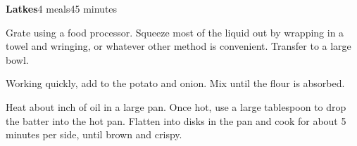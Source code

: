 \documentclass[../Cookbook.tex]{subfiles}
\begin{document}
\begin{recipe}[Latke]{\textbf{Latkes}}{4 meals}{45 minutes}

Grate using a food processor. Squeeze most of the liquid out by wrapping in a towel and wringing, or whatever other method is convenient.
Transfer to a large bowl.

Working quickly, add to the potato and onion. Mix until the flour is absorbed.

Heat about  inch of oil in a large pan. Once hot, use a large tablespoon to drop the batter into the hot pan. Flatten into disks in the pan and cook for about 5 minutes per side, until brown and crispy.

\end{recipe}
\end{document}
